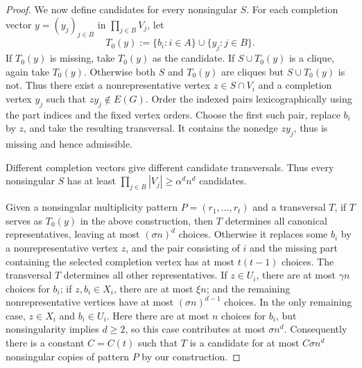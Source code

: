 \documentclass[10pt,a4paper]{amsart}
\begin{document}
\begin{proof}
We now define candidates for every nonsingular \(S\). For each completion vector \(y=(y_j)_{j\in B}\) in \(\prod_{j\in B}V_j\), let
\begin{equation*}
T_0(y):=\{b_i:i\in A\}\cup\{y_j:j\in B\}.
\end{equation*}
If \(T_0(y)\) is missing, take \(T_0(y)\) as the candidate. If \(S\cup T_0(y)\) is a clique,
again take \(T_0(y)\). Otherwise both \(S\) and \(T_0(y)\) are cliques but \(S\cup T_0(y)\) is not.
Thus there exist a nonrepresentative vertex \(z\in S\cap V_i\) and a completion vertex \(y_j\) such
that \(zy_j\notin E(G)\). Order the indexed pairs lexicographically using the part indices and the
fixed vertex orders. Choose the first such pair, replace \(b_i\) by \(z\), and take the resulting transversal.
It contains the nonedge \(zy_j\), thus is missing and hence admissible.

Different completion vectors give different candidate transversals.
Thus every nonsingular \(S\) has at least \(\prod_{j\in B}|V_j|\ge \alpha^d n^d\) candidates.

Given a nonsingular multiplicity pattern \(P=(r_1,\ldots,r_t)\) and a transversal \(T\),
if \(T\) serves as \(T_0(y)\) in the above construction,
then \(T\) determines all canonical representatives, leaving at most \((\sigma n)^d\) choices.
Otherwise it replaces some \(b_i\) by a nonrepresentative vertex \(z\), and the pair consisting
of \(i\) and the missing part containing the selected completion vertex has at most \(t(t-1)\) choices.
The transversal \(T\) determines all other representatives.
If \(z\in U_i\), there are at most \(\gamma n\) choices for \(b_i\); if \(z,b_i\in X_i\), there are
at most \(\xi n\); and the remaining nonrepresentative vertices have at most \((\sigma n)^{d-1}\) choices.
In the only remaining case, \(z\in X_i\) and \(b_i\in U_i\). Here there are at most \(n\) choices for \(b_i\),
but nonsingularity implies \(d\ge2\), so this case contributes at most \(\sigma n^d\).
Consequently there is a constant \(C=C(t)\) such that \(T\) is a candidate for at most \(C\sigma n^d\)
nonsingular copies of pattern \(P\) by our construction.


\end{proof}
\end{document}
